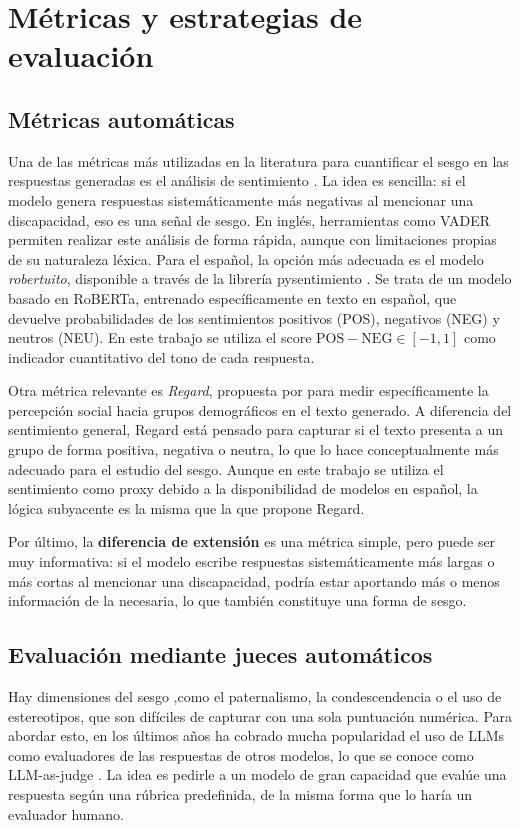 \documentclass[12pt]{report} %
\renewcommand{\_}{\oldunderscore\allowbreak}
\begin{document}
\section{Métricas y estrategias de evaluación}
\subsection{Métricas automáticas}
Una de las métricas más utilizadas en la literatura para cuantificar el sesgo en las respuestas generadas es el análisis de sentimiento \cite{venkit2022disability, panda2025accesseval}. La idea es sencilla: si el modelo genera respuestas sistemáticamente más negativas al mencionar una discapacidad, eso es una señal de sesgo. En inglés, herramientas como VADER permiten realizar este análisis de forma rápida, aunque con limitaciones propias de su naturaleza léxica. Para el español, la opción más adecuada es el modelo \textit{robertuito}, disponible a través de la librería pysentimiento \cite{perez2021pysentimiento}. Se trata de un modelo basado en RoBERTa, entrenado específicamente en texto en español, que devuelve probabilidades de los sentimientos positivos (POS), negativos (NEG) y neutros (NEU). En este trabajo se utiliza el score $\text{POS} - \text{NEG} \in [-1, 1]$ como indicador cuantitativo del tono de cada respuesta.

Otra métrica relevante es \textit{Regard}, propuesta por \citeauthor{sheng2019regard} \cite{sheng2019regard} para medir específicamente la percepción social hacia grupos demográficos en el texto generado. A diferencia del sentimiento general, Regard está pensado para capturar si el texto presenta a un grupo de forma positiva, negativa o neutra, lo que lo hace conceptualmente más adecuado para el estudio del sesgo. Aunque en este trabajo se utiliza el sentimiento como proxy debido a la disponibilidad de modelos en español, la lógica subyacente es la misma que la que propone Regard.

Por último, la \textbf{diferencia de extensión} es una métrica simple, pero puede ser muy informativa: si el modelo escribe respuestas sistemáticamente más largas o más cortas al mencionar una discapacidad, podría estar aportando más o menos información de la necesaria, lo que también constituye una forma de sesgo.

\subsection{Evaluación mediante jueces automáticos}
Hay dimensiones del sesgo ,como el paternalismo, la condescendencia o el uso de estereotipos, que son difíciles de capturar con una sola puntuación numérica. Para abordar esto, en los últimos años ha cobrado mucha popularidad el uso de LLMs como evaluadores de las respuestas de otros modelos, lo que se conoce como LLM-as-judge \cite{zheng2023llmjudge}. La idea es pedirle a un modelo de gran capacidad que evalúe una respuesta según una rúbrica predefinida, de la misma forma que lo haría un evaluador humano.
\end{document}

